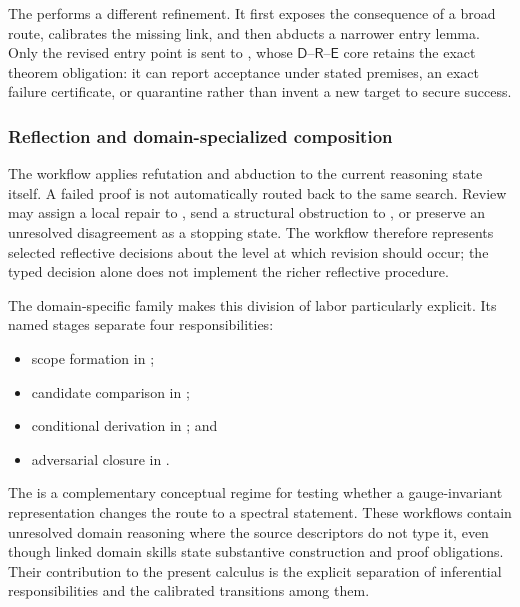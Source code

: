 The  performs a different refinement. It
first exposes the consequence of a broad route, calibrates the missing link,
and then abducts a narrower entry lemma. Only the revised entry point is sent
to , whose $\mathsf{D}$--$\mathsf{R}$--$\mathsf{E}$
core retains the exact theorem obligation: it can report acceptance under stated
premises, an exact failure certificate, or quarantine rather than invent a new
target to secure success.

\subsubsection{Reflection and domain-specialized composition}

The  workflow applies refutation and
abduction to the current reasoning state itself. A failed proof is not
automatically routed back to the same search. Review may assign a local repair
to , send a structural obstruction to
, or preserve an unresolved
disagreement as a stopping state. The workflow therefore represents selected
reflective decisions about the level at which revision should occur; the typed
decision alone does not implement the richer reflective procedure.

The domain-specific  family makes this division of labor
particularly explicit. Its named stages separate four responsibilities:
\begin{itemize}[leftmargin=*,itemsep=0.15em,topsep=0.25em]
\item scope formation in ;
\item candidate comparison in ;
\item conditional derivation in ; and
\item adversarial closure in .
\end{itemize}
The
 is a complementary conceptual
regime for testing whether a gauge-invariant representation changes the route
to a spectral statement. These workflows contain unresolved domain reasoning
where the source descriptors do not type it, even though linked domain skills
state substantive construction and proof obligations. Their contribution to the present
calculus is the explicit separation of inferential responsibilities and the
calibrated transitions among them.

